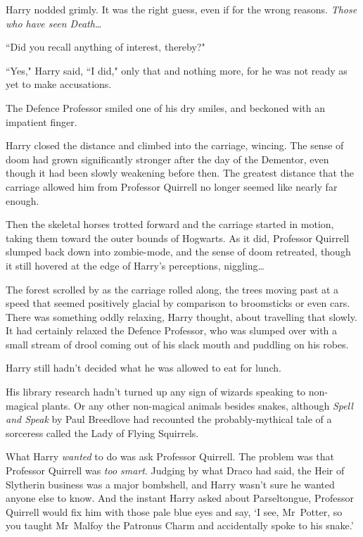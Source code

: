 Harry nodded grimly. It was the right guess, even if for the wrong reasons. \emph{Those who have seen Death{\ldots}}

``Did you recall anything of interest, thereby?"

``Yes," Harry said, ``I did," only that and nothing more, for he was not ready as yet to make accusations.

The Defence Professor smiled one of his dry smiles, and beckoned with an impatient finger.

Harry closed the distance and climbed into the carriage, wincing. The sense of doom had grown significantly stronger after the day of the Dementor, even though it had been slowly weakening before then. The greatest distance that the carriage allowed him from Professor Quirrell no longer seemed like nearly far enough.

Then the skeletal horses trotted forward and the carriage started in motion, taking them toward the outer bounds of Hogwarts. As it did, Professor Quirrell slumped back down into zombie-mode, and the sense of doom retreated, though it still hovered at the edge of Harry's perceptions, niggling{\ldots}

The forest scrolled by as the carriage rolled along, the trees moving past at a speed that seemed positively glacial by comparison to broomsticks or even cars. There was something oddly relaxing, Harry thought, about travelling that slowly. It had certainly relaxed the Defence Professor, who was slumped over with a small stream of drool coming out of his slack mouth and puddling on his robes.

Harry still hadn't decided what he was allowed to eat for lunch.

His library research hadn't turned up any sign of wizards speaking to non-magical plants. Or any other non-magical animals besides snakes, although \emph{Spell and Speak} by Paul Breedlove had recounted the probably-mythical tale of a sorceress called the Lady of Flying Squirrels.

What Harry \emph{wanted} to do was ask Professor Quirrell. The problem was that Professor Quirrell was \emph{too smart}. Judging by what Draco had said, the Heir of Slytherin business was a major bombshell, and Harry wasn't sure he wanted anyone else to know. And the instant Harry asked about Parseltongue, Professor Quirrell would fix him with those pale blue eyes and say, `I see, Mr~Potter, so you taught Mr~Malfoy the Patronus Charm and accidentally spoke to his snake.'

